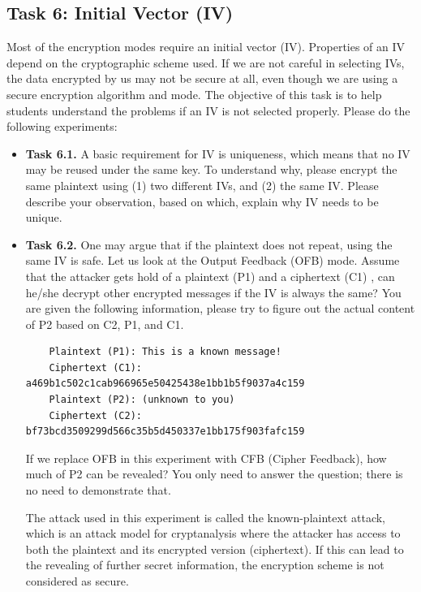 \documentclass[12pt]{article}
\begin{document}
\clearpage
\subsection{Task 6: Initial Vector (IV)}

Most of the encryption modes require an initial vector (IV). Properties of an IV depend on the cryptographic scheme used. If we are not careful in selecting IVs, the data encrypted by us may not be secure at all, even though we are using a secure encryption algorithm and mode. The objective of this task is to help students understand the problems if an IV is not selected properly. Please do the following experiments:

\begin{itemize}
    \item \textbf{Task 6.1.} A basic requirement for IV is uniqueness, which means that no IV may be reused under the same key. To understand why, please encrypt the same plaintext using (1) two different IVs, and (2) the same IV. Please describe your observation, based on which, explain why IV needs to be unique.
    \item \textbf{Task 6.2.} One may argue that if the plaintext does not repeat, using the same IV is safe. Let us look at the Output Feedback (OFB) mode. Assume that the attacker gets hold of a plaintext (P1) and a ciphertext (C1) , can he/she decrypt other encrypted messages if the IV is always the same? You are given the following information, please try to figure out the actual content of P2 based on C2, P1, and C1.
    
    \begin{verbatim}
    Plaintext (P1): This is a known message!
    Ciphertext (C1): a469b1c502c1cab966965e50425438e1bb1b5f9037a4c159
    Plaintext (P2): (unknown to you)
    Ciphertext (C2): bf73bcd3509299d566c35b5d450337e1bb175f903fafc159
    \end{verbatim}
        
    If we replace OFB in this experiment with CFB (Cipher Feedback), how much of P2 can be revealed? You only need to answer the question; there is no need to demonstrate that.
    
    The attack used in this experiment is called the known-plaintext attack, which is an attack model for cryptanalysis where the attacker has access to both the plaintext and its encrypted version (ciphertext). If this can lead to the revealing of further secret information, the encryption scheme is not considered as secure.
    

\end{itemize}
\end{document}
